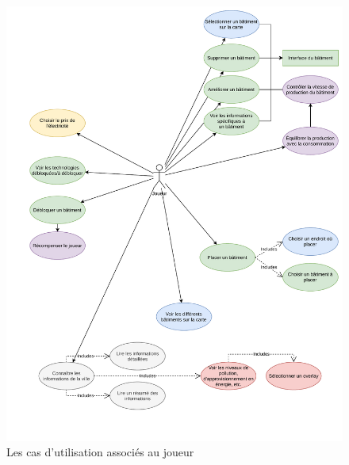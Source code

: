 \documentclass[12pt]{article}
\begin{document}
\begin{figure}[H]
    \includegraphics[width=\textwidth]{uml-usecases-Page-2}
    \caption{Les cas d'utilisation associés au joueur \label{fig:usecase-player}}
\end{figure}
\end{document}
